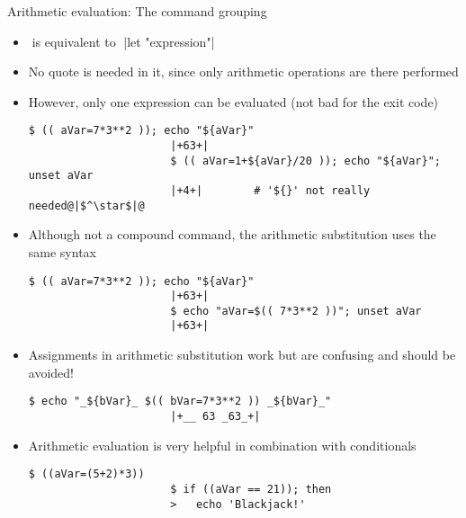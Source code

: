 \begin{frame}[fragile]{Arithmetic evaluation: The command grouping \PB{\texttt{((\ldots))}}}
    \vspace{-4mm}
    \begin{overlayarea}{\textwidth}{0.7\textheight}
        \begin{itemize}
            \item<only@1>  $\;$is  equivalent to$\;$ \bash|let "expression"|
            \item<only@1> No quote is needed in it, since only arithmetic operations are there performed
            \item<only@1> However, only one expression can be evaluated (not bad for the exit code)
                  \begin{lstlisting}[style=MyBash, style=oddnumbers, aboveskip=2mm, belowskip=-6mm]
                      $ (( aVar=7*3**2 )); echo "${aVar}"
                      |+63+|
                      $ (( aVar=1+${aVar}/20 )); echo "${aVar}"; unset aVar
                      |+4+|        # '${}' not really needed@|$^\star$|@
                  \end{lstlisting}
            \item<only@1> Although not a compound command, the arithmetic substitution uses the same syntax
                  \begin{lstlisting}[style=MyBash, style=oddnumbers, aboveskip=2mm, belowskip=-6mm]
                      $ (( aVar=7*3**2 )); echo "${aVar}"
                      |+63+|
                      $ echo "aVar=$(( 7*3**2 ))"; unset aVar
                      |+63+|
                  \end{lstlisting}
            \item<only@1> Assignments in arithmetic substitution work but are confusing and should be avoided!
                  \begin{lstlisting}[style=MyBash, style=oddnumbers, aboveskip=2mm, belowskip=-6mm]
                      $ echo "_${bVar}_ $(( bVar=7*3**2 )) _${bVar}_"
                      |+__ 63 _63_+|
                  \end{lstlisting}
            \item<only@2> Arithmetic evaluation is very helpful in combination with conditionals
                  \begin{lstlisting}[style=MyBash, aboveskip=2mm, belowskip=-6mm]
                      $ ((aVar=(5+2)*3))
                      $ if ((aVar == 21)); then
                      >   echo 'Blackjack!'

\end{lstlisting}
\end{itemize}
\end{overlayarea}
\end{frame}
